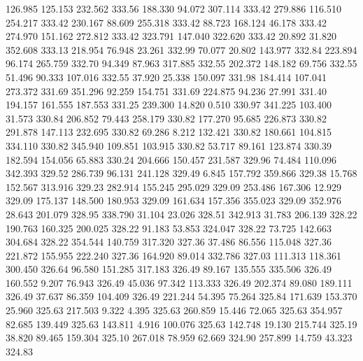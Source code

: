  126.985  125.153  232.562       333.56
 188.330   94.072  307.114       333.42
 279.886  116.510  254.217       333.42
 230.167   88.609  255.318       333.42
  88.723  168.124   46.178       333.42
 274.970  151.162  272.812       333.42
 323.791  147.040  322.620       333.42
  20.892   31.820  352.608       333.13
 218.954   76.948   23.261       332.99
  70.077   20.802  143.977       332.84
 223.894   96.174  265.759       332.70
  94.349   87.963  317.885       332.55
 202.372  148.182   69.756       332.55
  51.496   90.333  107.016       332.55
  37.920   25.338  150.097       331.98
 184.414  107.041  273.372       331.69
 351.296   92.259  154.751       331.69
 224.875   94.236   27.991       331.40
 194.157  161.555  187.553       331.25
 239.300   14.820    0.510       330.97
 341.225  103.400   31.573       330.84
 206.852   79.443  258.179       330.82
 177.270   95.685  226.873       330.82
 291.878  147.113  232.695       330.82
  69.286    8.212  132.421       330.82
 180.661  104.815  334.110       330.82
 345.940  109.851  103.915       330.82
  53.717   89.161  123.874       330.39
 182.594  154.056   65.883       330.24
 204.666  150.457  231.587       329.96
  74.484  110.096  342.393       329.52
 286.739   96.131  241.128       329.49
   6.845  157.792  359.866       329.38
  15.768  152.567  313.916       329.23
 282.914  155.245  295.029       329.09
 253.486  167.306   12.929       329.09
 175.137  148.500  180.953       329.09
 161.634  157.356  355.023       329.09
 352.976   28.643  201.079       328.95
 338.790   31.104   23.026       328.51
 342.913   31.783  206.139       328.22
 190.763  160.325  200.025       328.22
  91.183   53.853  324.047       328.22
  73.725  142.663  304.684       328.22
 354.544  140.759  317.320       327.36
  37.486   86.556  115.048       327.36
 221.872  155.955  222.240       327.36
 164.920   89.014  332.786       327.03
 111.313  118.361  300.450       326.64
  96.580  151.285  317.183       326.49
  89.167  135.555  335.506       326.49
 160.552    9.207   76.943       326.49
  45.036   97.342  113.333       326.49
 202.374   89.080  189.111       326.49
  37.637   86.359  104.409       326.49
 221.244   54.395   75.264       325.84
 171.639  153.370   25.960       325.63
 217.503    9.322    4.395       325.63
 260.859   15.446   72.065       325.63
 354.957   82.685  139.449       325.63
 143.811    4.916  100.076       325.63
 142.748   19.130  215.744       325.19
  38.820   89.465  159.304       325.10
 267.018   78.959   62.669       324.90
 257.899   14.759   43.323       324.83
